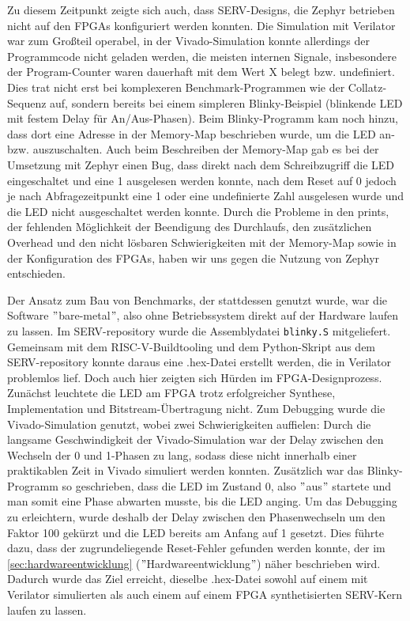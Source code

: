     Zu diesem Zeitpunkt zeigte sich auch, dass SERV-Designs, die Zephyr betrieben nicht auf den FPGAs konfiguriert werden konnten.
    Die Simulation mit Verilator war zum Großteil operabel, in der Vivado-Simulation konnte allerdings der Programmcode nicht geladen werden, die meisten internen Signale, insbesondere der Program-Counter waren dauerhaft mit dem Wert X belegt bzw. undefiniert.
    Dies trat nicht erst bei komplexeren Benchmark-Programmen wie der Collatz-Sequenz auf, sondern bereits bei einem simpleren Blinky-Beispiel (blinkende LED mit festem Delay für An/Aus-Phasen).
    Beim Blinky-Programm kam noch hinzu, dass dort eine Adresse in der Memory-Map beschrieben wurde, um die LED an- bzw. auszuschalten.
    Auch beim Beschreiben der Memory-Map gab es bei der Umsetzung mit Zephyr einen Bug, dass direkt nach dem Schreibzugriff die LED eingeschaltet und eine 1 ausgelesen werden konnte, nach dem Reset auf 0 jedoch je nach Abfragezeitpunkt eine 1 oder eine undefinierte Zahl ausgelesen wurde und die LED nicht ausgeschaltet werden konnte.
    Durch die Probleme in den prints, der fehlenden Möglichkeit der Beendigung des Durchlaufs, den zusätzlichen Overhead und den nicht lösbaren Schwierigkeiten mit der Memory-Map sowie in der Konfiguration des FPGAs, haben wir uns gegen die Nutzung von Zephyr entschieden.

    Der Ansatz zum Bau von Benchmarks, der stattdessen genutzt wurde, war die Software \("\)bare-metal\("\), also ohne Betriebssystem direkt auf der Hardware laufen zu lassen.
    Im SERV-repository wurde die Assemblydatei \verb|blinky.S| mitgeliefert.
    Gemeinsam mit dem RISC-V-Buildtooling \parencite{risc-buildtool} und dem Python-Skript aus dem SERV-repository konnte daraus eine .hex-Datei erstellt werden, die in Verilator problemlos lief.
    Doch auch hier zeigten sich Hürden im FPGA-Designprozess.
    Zunächst leuchtete die LED am FPGA trotz erfolgreicher Synthese, Implementation und Bitstream-Übertragung nicht.
    Zum Debugging wurde die Vivado-Simulation genutzt, wobei zwei Schwierigkeiten auffielen:
    Durch die langsame Geschwindigkeit der Vivado-Simulation war der Delay zwischen den Wechseln der 0 und 1-Phasen zu lang, sodass diese nicht innerhalb einer praktikablen Zeit in Vivado simuliert werden konnten.
    Zusätzlich war das Blinky-Programm so geschrieben, dass die LED im Zustand 0, also \("\)aus\("\) startete und man somit eine Phase abwarten musste, bis die LED anging.
    Um das Debugging zu erleichtern, wurde deshalb der Delay zwischen den Phasenwechseln um den Faktor 100 gekürzt und die LED bereits am Anfang auf 1 gesetzt.
    Dies führte dazu, dass der zugrundeliegende Reset-Fehler gefunden werden konnte, der im \cref{sec:hardwareentwicklung} (\("\)Hardwareentwicklung\("\)) näher beschrieben wird.
    Dadurch wurde das Ziel erreicht, dieselbe .hex-Datei sowohl auf einem mit Verilator simulierten als auch einem auf einem FPGA synthetisierten SERV-Kern laufen zu lassen.

